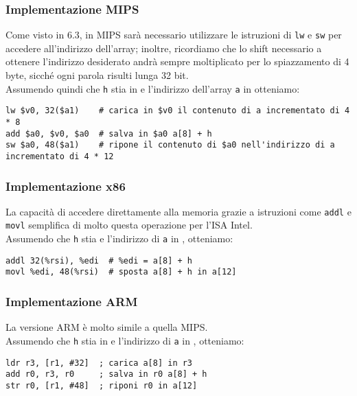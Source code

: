 \documentclass[class=book, crop=false, oneside]{standalone}
\begin{document}
\subsubsection{Implementazione MIPS}
Come visto in 6.3, in MIPS sarà necessario utilizzare le istruzioni di \texttt{lw} e \texttt{sw} per accedere all'indirizzo dell'array; inoltre, ricordiamo che  lo shift necessario a ottenere l'indirizzo desiderato andrà sempre moltiplicato per lo spiazzamento di 4 byte, sicché ogni parola risulti lunga 32 bit.\\
Assumendo quindi che \texttt{h} stia in  e l'indirizzo dell'array \texttt{a} in  otteniamo:
\begin{verbatim}
lw $v0, 32($a1)    # carica in $v0 il contenuto di a incrementato di 4 * 8
add $a0, $v0, $a0  # salva in $a0 a[8] + h
sw $a0, 48($a1)    # ripone il contenuto di $a0 nell'indirizzo di a incrementato di 4 * 12
\end{verbatim}

\subsubsection{Implementazione x86}
La capacità di accedere direttamente alla memoria grazie a istruzioni come \texttt{addl} e \texttt{movl} semplifica di molto questa operazione per l'ISA Intel.\\
Assumendo che  \texttt{h} stia  e l'indirizzo di \texttt{a} in , otteniamo:
\begin{verbatim}
addl 32(%rsi), %edi  # %edi = a[8] + h
movl %edi, 48(%rsi)  # sposta a[8] + h in a[12]
\end{verbatim}

\subsubsection{Implementazione ARM}
La versione ARM è molto simile a quella MIPS.\\
Assumendo che \texttt{h} stia in  e l'indirizzo di \texttt{a} in , otteniamo:
\begin{verbatim}
ldr r3, [r1, #32]  ; carica a[8] in r3
add r0, r3, r0     ; salva in r0 a[8] + h
str r0, [r1, #48]  ; riponi r0 in a[12]
\end{verbatim}
\end{document}
